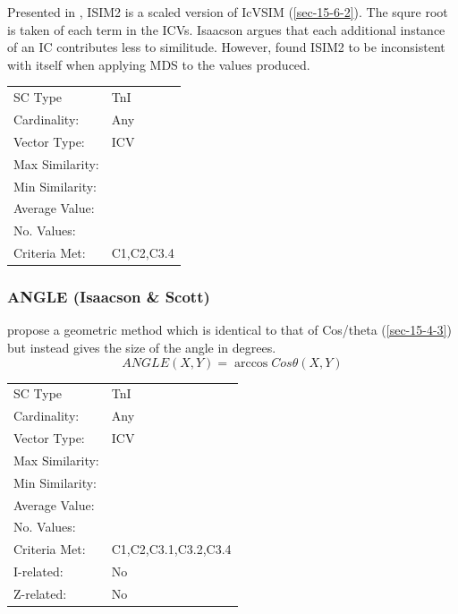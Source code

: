 \documentclass{article}
\begin{document}
Presented in \citet{Isaacson1996}, ISIM2 is a scaled version of IcVSIM
(\ref{sec-15-6-2}). The squre root is taken of each term in the ICVs. Isaacson
argues that each additional instance of an IC contributes less to
similitude. However, \citet{Samplaski2005a} found ISIM2 to be
inconsistent with itself when applying MDS to the values produced.

\begin{center}
\begin{tabular}{ll}
 SC Type          &  TnI         \\
 Cardinality:     &  Any         \\
 Vector Type:     &  ICV         \\
 Max Similarity:  &              \\
 Min Similarity:  &              \\
 Average Value:   &              \\
 No. Values:      &              \\
 Criteria Met:    &  C1,C2,C3.4  \\
\end{tabular}
\end{center}
\subsubsection{ANGLE (Isaacson \& Scott)}
\label{sec-15-6-4}

\citet{Scott1998} propose a geometric method which is identical to
that of Cos/theta (\ref{sec-15-4-3}) but instead gives the size of the
angle in degrees. $$ANGLE(X,Y) = \arccos{Cos\theta(X,Y)}$$

\begin{center}
\begin{tabular}{ll}
 SC Type          &  TnI                   \\
 Cardinality:     &  Any                   \\
 Vector Type:     &  ICV                   \\
 Max Similarity:  &                        \\
 Min Similarity:  &                        \\
 Average Value:   &                        \\
 No. Values:      &                        \\
 Criteria Met:    &  C1,C2,C3.1,C3.2,C3.4  \\
 I-related:       &  No                    \\
 Z-related:       &  No                    \\
\end{tabular}
\end{center}
\end{document}
